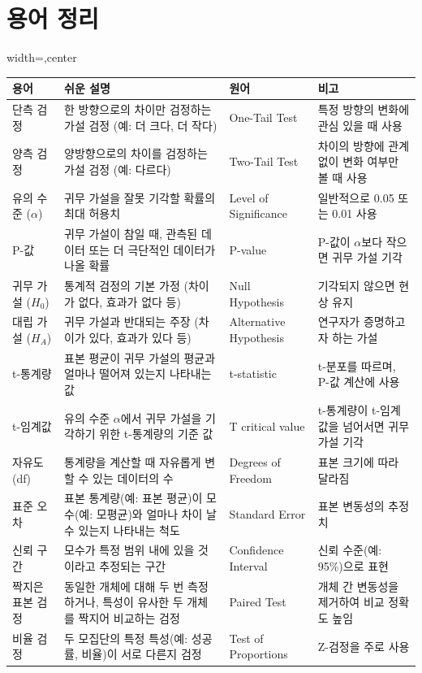 \documentclass[11pt,a4paper]{book}
\theoremstyle{definition}
\begin{document}
\section{용어 정리}
\begin{adjustbox}{width=\textwidth,center}
\begin{tabular}{llll}
\toprule
\textbf{용어} & \textbf{쉬운 설명} & \textbf{원어} & \textbf{비고} \\
\midrule
단측 검정 & 한 방향으로의 차이만 검정하는 가설 검정 (예: 더 크다, 더 작다) & One-Tail Test & 특정 방향의 변화에 관심 있을 때 사용 \\
양측 검정 & 양방향으로의 차이를 검정하는 가설 검정 (예: 다르다) & Two-Tail Test & 차이의 방향에 관계없이 변화 여부만 볼 때 사용 \\
유의 수준 ($\alpha$) & 귀무 가설을 잘못 기각할 확률의 최대 허용치 & Level of Significance & 일반적으로 0.05 또는 0.01 사용 \\
P-값 & 귀무 가설이 참일 때, 관측된 데이터 또는 더 극단적인 데이터가 나올 확률 & P-value & P-값이 $\alpha$보다 작으면 귀무 가설 기각 \\
귀무 가설 ($H_0$) & 통계적 검정의 기본 가정 (차이가 없다, 효과가 없다 등) & Null Hypothesis & 기각되지 않으면 현상 유지 \\
대립 가설 ($H_A$) & 귀무 가설과 반대되는 주장 (차이가 있다, 효과가 있다 등) & Alternative Hypothesis & 연구자가 증명하고자 하는 가설 \\
t-통계량 & 표본 평균이 귀무 가설의 평균과 얼마나 떨어져 있는지 나타내는 값 & t-statistic & t-분포를 따르며, P-값 계산에 사용 \\
t-임계값 & 유의 수준 $\alpha$에서 귀무 가설을 기각하기 위한 t-통계량의 기준 값 & T critical value & t-통계량이 t-임계값을 넘어서면 귀무 가설 기각 \\
자유도 (df) & 통계량을 계산할 때 자유롭게 변할 수 있는 데이터의 수 & Degrees of Freedom & 표본 크기에 따라 달라짐 \\
표준 오차 & 표본 통계량(예: 표본 평균)이 모수(예: 모평균)와 얼마나 차이 날 수 있는지 나타내는 척도 & Standard Error & 표본 변동성의 추정치 \\
신뢰 구간 & 모수가 특정 범위 내에 있을 것이라고 추정되는 구간 & Confidence Interval & 신뢰 수준(예: 95\%)으로 표현 \\
짝지은 표본 검정 & 동일한 개체에 대해 두 번 측정하거나, 특성이 유사한 두 개체를 짝지어 비교하는 검정 & Paired Test & 개체 간 변동성을 제거하여 비교 정확도 높임 \\
비율 검정 & 두 모집단의 특정 특성(예: 성공률, 비율)이 서로 다른지 검정 & Test of Proportions & Z-검정을 주로 사용 \\
\bottomrule
\end{tabular}
\end{adjustbox}
\end{document}
